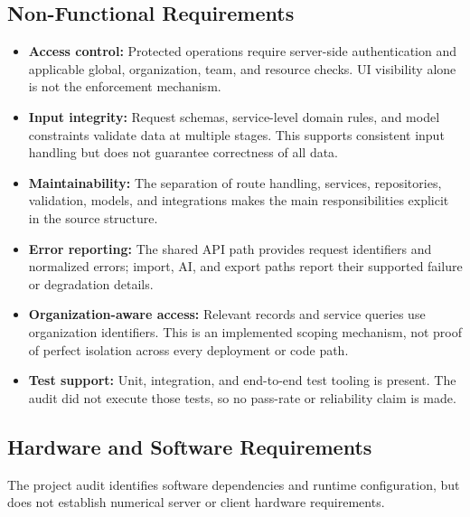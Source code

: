 \subsection{Non-Functional Requirements}

\begin{itemize}
    \item \textbf{Access control:} Protected operations require server-side authentication and applicable global, organization, team, and resource checks. UI visibility alone is not the enforcement mechanism.
    \item \textbf{Input integrity:} Request schemas, service-level domain rules, and model constraints validate data at multiple stages. This supports consistent input handling but does not guarantee correctness of all data.
    \item \textbf{Maintainability:} The separation of route handling, services, repositories, validation, models, and integrations makes the main responsibilities explicit in the source structure.
    \item \textbf{Error reporting:} The shared API path provides request identifiers and normalized errors; import, AI, and export paths report their supported failure or degradation details.
    \item \textbf{Organization-aware access:} Relevant records and service queries use organization identifiers. This is an implemented scoping mechanism, not proof of perfect isolation across every deployment or code path.
    \item \textbf{Test support:} Unit, integration, and end-to-end test tooling is present. The audit did not execute those tests, so no pass-rate or reliability claim is made.
\end{itemize}

\subsection{Hardware and Software Requirements}

The project audit identifies software dependencies and runtime configuration, but does not establish numerical server or client hardware requirements.

